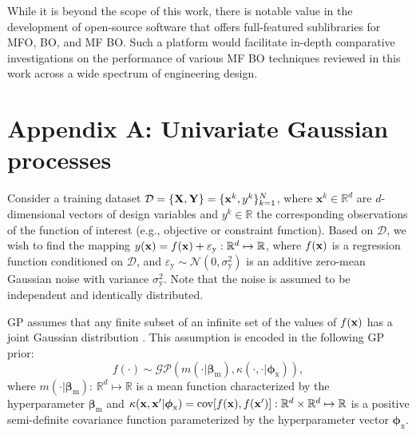\documentclass[journal ]{new-aiaa}
\newcommand{\edit}[1]{\textcolor{red}{#1}} %
\begin{document}
While it is beyond the scope of this work, there is notable value in the development of open-source software that offers full-featured sublibraries for MFO, BO, and MF BO.
Such a platform would facilitate in-depth comparative investigations on the performance of various MF BO techniques reviewed in this work across a wide spectrum of engineering design.

\section*{Appendix A: Univariate Gaussian processes}\label{AppA}
\setcounter{equation}{0} %
\renewcommand{\theequation}{A.\arabic{equation}} %

Consider a training dataset $\mathcal{D}=\left\{ {\bf X},{\bf Y}\right\}=\{{\bf x}^k,y^k\}_{k=1}^N$, where $\textbf{x}^k\in\mathbb{R}^d$ are $d$-dimensional vectors of design variables and $y^k\in\mathbb{R}$ the corresponding observations of the function of interest (e.g., objective or constraint function).
Based on $\mathcal{D}$, we wish to find the mapping $y({\bf x})=f({\bf x}) + \varepsilon_\text{y}: \mathbb{R}^d \mapsto \mathbb{R}$, where $f({\bf x})$ is a regression function conditioned on $\mathcal{D}$, and $\varepsilon_\text{y} \sim \mathcal{N}(0,\sigma^2_\text{y})$ is an additive zero-mean Gaussian noise with variance $\sigma^2_\text{y}$.
Note that the noise is assumed to be independent and identically distributed.

GP assumes that any finite subset of an infinite set of the values of $f({\bf x})$ has a joint Gaussian distribution \citep{Rasmussen2006}.
This assumption is encoded in the following GP prior:
\begin{equation}\label{eqnA1}
	f(\cdot) \sim \mathcal{GP} \left(m(\cdot|\boldsymbol \beta_\text{m}),\kappa(\cdot,\cdot|\boldsymbol \phi_{\text{x}})\right),
\end{equation}
where  $m(\cdot|\boldsymbol \beta_{\text{m}})$: $\mathbb{R}^d \mapsto \mathbb{R}$ is a mean function characterized by the hyperparameter $\boldsymbol \beta_{\text{m}}$ and $\kappa({\bf x},{\bf x}'|\boldsymbol \phi_{\text{x}}) = \text{cov}[f({\bf x}),f({\bf x}')]: \mathbb{R}^d \times \mathbb{R}^d \mapsto \mathbb{R} $ is %
{a positive semi-definite} covariance function parameterized by the hyperparameter vector $\boldsymbol \phi_{\text{x}}$.
\end{document}
